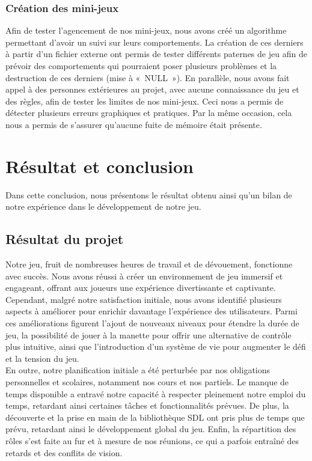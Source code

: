 \documentclass[12pt,a4paper]{article}
\begin{document}
            \subsubsection{Création des mini-jeux}
                \tabto{1cm} Afin de tester l’agencement de nos mini-jeux, nous avons créé un algorithme permettant d’avoir un suivi sur leurs comportements. La création de ces derniers à partir d’un fichier externe ont permis de tester différents paternes de jeu afin de prévoir des comportements qui pourraient poser plusieurs problèmes et la destruction de ces derniers (mise à «~NULL~»). En parallèle, nous avons fait appel à des personnes extérieures au projet, avec aucune connaissance du jeu et des règles, afin de tester les limites de nos mini-jeux. Ceci nous a permis de détecter plusieurs erreurs graphiques et pratiques. Par la même occasion, cela nous a permis de s’assurer qu’aucune fuite de mémoire était présente.
            
    \newpage

    \section{Résultat et conclusion}
        \tabto{1cm} Dans cette conclusion, nous présentons le résultat obtenu ainsi qu'un bilan de notre expérience dans le développement de notre jeu.\\

        \subsection{Résultat du projet}
            \tabto{1cm} Notre jeu, fruit de nombreuses heures de travail et de dévouement, fonctionne avec succès. Nous avons réussi à créer un environnement de jeu immersif et engageant, offrant aux joueurs une expérience divertissante et captivante. Cependant, malgré notre satisfaction initiale, nous avons identifié plusieurs aspects à améliorer pour enrichir davantage l'expérience des utilisateurs. Parmi ces améliorations figurent l'ajout de nouveaux niveaux pour étendre la durée de jeu, la possibilité de jouer à la manette pour offrir une alternative de contrôle plus intuitive, ainsi que l'introduction d'un système de vie pour augmenter le défi et la tension du jeu.\\
            
            En outre, notre planification initiale a été perturbée par nos obligations personnelles et scolaires, notamment nos cours et nos partiels. Le manque de temps disponible a entravé notre capacité à respecter pleinement notre emploi du temps, retardant ainsi certaines tâches et fonctionnalités prévues. De plus, la découverte et la prise en main de la bibliothèque SDL ont pris plus de temps que prévu, retardant ainsi le développement global du jeu. Enfin, la répartition des rôles s'est faite au fur et à mesure de nos réunions, ce qui a parfois entraîné des retards et des conflits de vision.\\
\end{document}
